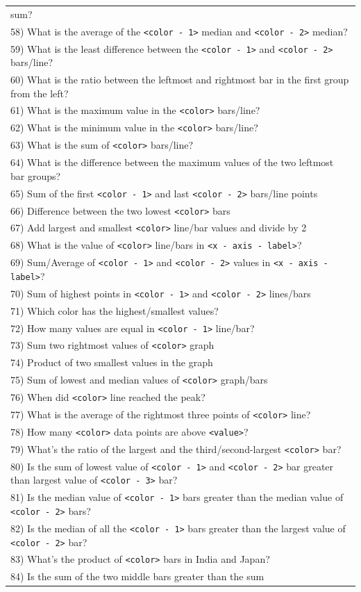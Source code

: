\begin{table}[t]
{\begin{tabular}{|l|}
sum? \\58) What is the average of the  \texttt{<color - 1>} median and  \texttt{<color - 2>} median? \\59) What is the least difference between the  \texttt{<color - 1>} and \texttt{<color - 2>} bars/line? \\60) What is the ratio between the leftmost and rightmost bar in the first group from the left? \\61) What is the maximum value in the  \texttt{<color>} bars/line? \\62) What is the minimum value in the  \texttt{<color>} bars/line? \\63) What is the sum of  \texttt{<color>} bars/line? \\64) What is the difference between the maximum values of the two leftmost bar groups? \\65) Sum of the first \texttt{<color - 1>} and last \texttt{<color - 2>} bars/line points \\66) Difference between the two lowest \texttt{<color>} bars \\67) Add largest and smallest \texttt{<color>} line/bar values and divide by 2 \\68) What is the value of \texttt{<color>} line/bars in \texttt{<x - axis - label>}? \\69) Sum/Average of \texttt{<color - 1>} and \texttt{<color - 2>} values in \texttt{<x - axis - label>}? \\70) Sum of highest points in \texttt{<color - 1>} and \texttt{<color - 2>} lines/bars \\71) Which color has the highest/smallest values? \\72) How many values are equal in \texttt{<color - 1>} line/bar? \\73) Sum two rightmost values of \texttt{<color>} graph \\74) Product of two smallest values in the graph \\75) Sum of lowest and median values of \texttt{<color>} graph/bars \\76) When did \texttt{<color>} line reached the peak? \\77) What is the average of the rightmost three points of \texttt{<color>} line? \\78) How many \texttt{<color>} data points are above \texttt{<value>}? \\79) What's the ratio of the largest and the third/second-largest \texttt{<color>} bar? \\80) Is the sum of lowest value of \texttt{<color - 1>} and \texttt{<color - 2>} bar greater than largest value of \texttt{<color - 3>} bar? \\81) Is the median value of \texttt{<color - 1>} bars greater than the median value of \texttt{<color - 2>} bars? \\82) Is the median of all the \texttt{<color - 1>} bars greater than the largest value of \texttt{<color - 2>} bar? \\83) What's the product of \texttt{<color>} bars in India and Japan? \\84) Is the sum of the two middle bars greater than the sum 
\end{tabular}}
\end{table}
